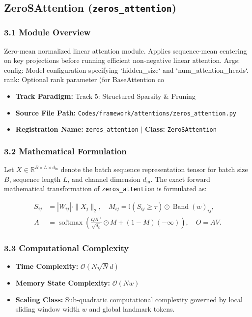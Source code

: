 \subsection{ZeroSAttention (\texttt{zeros\_attention})}
\label{sec:app_module_zeros\_attention}

\subsubsection*{3.1 Module Overview}
Zero-mean normalized linear attention module.  Applies sequence-mean centering on key projections before running efficient non-negative linear attention.  Args:     config: Model configuration specifying `hidden\_size` and `num\_attention\_heads`.     rank: Optional rank parameter (for BaseAttention co
\begin{itemize}
    \item \textbf{Track Paradigm:} Track 5: Structured Sparsity & Pruning
    \item \textbf{Source File Path:} \texttt{Codes/framework/attentions/zeros\_attention.py}
    \item \textbf{Registration Name:} \texttt{zeros\_attention} $\mid$ \textbf{Class:} \texttt{ZeroSAttention}
\end{itemize}

\subsubsection*{3.2 Mathematical Formulation}
Let $X \in \mathbb{R}^{B \times L \times d_{\text{in}}}$ denote the batch sequence representation tensor for batch size $B$, sequence length $L$, and channel dimension $d_{\text{in}}$. The exact forward mathematical transformation of \texttt{zeros\_attention} is formulated as:

\begin{align}
S_{ij} &= |W_{ij}| \cdot \|X_j\|_2, \quad M_{ij} = \mathbb{I}(S_{ij} \ge \tau) \odot \operatorname{Band}(w)_{ij}, \\
A &= \operatorname{softmax}\left(\frac{Q K^\top}{\sqrt{d_k}} \odot M + (1 - M)(-\infty)\right), \quad O = A V.
\end{align}


\subsubsection*{3.3 Computational Complexity}
\begin{itemize}
    \item \textbf{Time Complexity:} $\mathcal{O}(N \sqrt{N} d)$
    \item \textbf{Memory State Complexity:} $\mathcal{O}(N w)$
    \item \textbf{Scaling Class:} Sub-quadratic computational complexity governed by local sliding window width $w$ and global landmark tokens.
\end{itemize}

